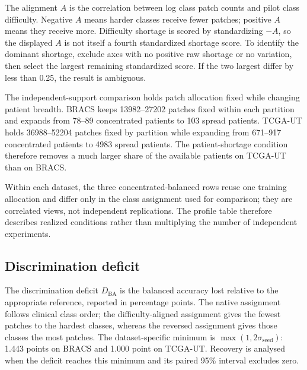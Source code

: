 \documentclass[11pt]{article}
\newcommand{\resultstable}[1]{}
\begin{document}
The alignment $A$ is the correlation between log class patch counts and pilot class difficulty. Negative $A$ means harder classes receive fewer patches; positive $A$ means they receive more. Difficulty shortage is scored by standardizing $-A$, so the displayed $A$ is not itself a fourth standardized shortage score. To identify the dominant shortage, exclude axes with no positive raw shortage or no variation, then select the largest remaining standardized score. If the two largest differ by less than \num{0.25}, the result is ambiguous.

\begin{table}[ht]
  \centering
  \scriptsize
  \setlength{\tabcolsep}{3pt}
  \resultstable{signal_profiles}
  \caption{Realized shortages for the four comparisons. Shortage scores $S$ are standardized within each dataset; negative values mean below-average shortage. $A$ is the unstandardized support--difficulty correlation. Dominance compares eligible signed scores, including standardized $-A$, with a \num{0.25}-standard-deviation ambiguity margin.}
  \label{tab:signal-profiles}
\end{table}

\noindent The independent-support comparison holds patch allocation fixed while changing patient breadth. BRACS keeps \num{13982}--\num{27202} patches fixed within each partition and expands from \num{78}--\num{89} concentrated patients to \num{103} spread patients. TCGA-UT holds \num{36988}--\num{52204} patches fixed by partition while expanding from \num{671}--\num{917} concentrated patients to \num{4983} spread patients. The patient-shortage condition therefore removes a much larger share of the available patients on TCGA-UT than on BRACS.

Within each dataset, the three concentrated-balanced rows reuse one training allocation and differ only in the class assignment used for comparison; they are correlated views, not independent replications. The profile table therefore describes realized conditions rather than multiplying the number of independent experiments.

\subsection{Discrimination deficit}
\label{sec:rq1-discrimination}
The discrimination deficit $D_{\mathrm{BA}}$ is the balanced accuracy lost relative to the appropriate reference, reported in percentage points. The native assignment follows clinical class order; the difficulty-aligned assignment gives the fewest patches to the hardest classes, whereas the reversed assignment gives those classes the most patches. The dataset-specific minimum is $\max(\num{1},2\sigma_{\mathrm{seed}})$: \num{1.443} points on BRACS and \num{1.000} point on TCGA-UT. Recovery is analysed when the deficit reaches this minimum and its paired \num{95}\% interval excludes zero.
\end{document}
